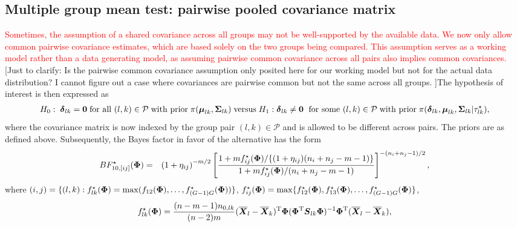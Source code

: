 \documentclass[times,sort&compress,3p]{elsarticle}
\theoremstyle{plain}%
\theoremstyle{definition}
\newcommand{\uzero}            {\mbox{\boldmath$0$}}
\def\be{\begin{eqnarray}}
\def\ee{\end{eqnarray}}
\def\trans{^{\rm T}}
\newcommand{\uS}       {\mbox{\boldmath$S$}}
\newcommand{\uX}       {\mbox{\boldmath$X$}}
\newcommand{\udelta}            {\mbox{\boldmath$\delta$}}
\newcommand{\umu}               {\mbox{\boldmath$\mu$}}
\newcommand{\uSigma}            {\mbox{\boldmath$\Sigma$}}
\newcommand{\uPhi}              {\mbox{\boldmath$\Phi$}}
\begin{document}
\subsection{Multiple group mean test: pairwise pooled covariance matrix} \label{sec:testid}
\textcolor{red}{Sometimes, the assumption of a shared covariance across all groups may not be well-supported by the available data. We now only allow common pairwise covariance estimates, which are based solely on the two groups being compared. This assumption serves as a working model rather than a data generating model, as assuming pairwise common covariance across all pairs also implies common covariances.} {\color{blue}[Just to clarify: Is the pairwise common covariance assumption only posited here for our working model but not for the actual data distribution? I cannot figure out a case where covariances are pairwise common but not the same across all groups. ]}The hypothesis of interest is then expressed as
\be
H_{0}:\;\udelta_{lk} = \uzero \; \mbox{for all }(l, k)\in\mathcal{P}
\;\mbox{with prior}\; \pi(\umu_{lk},\uSigma_{lk})\; \mbox{versus} \; H_{1}:
\udelta_{lk} \neq \uzero \; \mbox{ for some }(l, k)\in\mathcal{P}
\; \mbox{with prior} \; \pi(\udelta_{lk},\umu_{lk},\uSigma_{lk} | \tau_{lk}^\star), 
\label{eq:test2.3}
\ee
where the covariance matrix is now indexed by the group pair $(l, k)\in\mathcal{P}$ and is allowed to be different across pairs. The priors are as defined above. Subsequently, the Bayes factor in favor of the alternative has the form
\be
BF^{\star}_{10,[ij]}(\uPhi) &=& \left(1 + \eta_{ij} \right)^{-m/2} \left[ \frac{1 + {m f^{\star}_{ij}(\uPhi)}/\{(1 + \eta_{ij})(n_{i}+n_{j}-m-1)\}}{ 1 + {m f^{\star}_{ij}(\uPhi)}/{(n_{i}+n_{j}-m-1)}  } \right]^{-(n_{i}+n_{j}-1)/2}, \label{eq:BFmaxija}
\ee
where $(i, j) = \{(l, k) : f_{lk}^\star(\uPhi) = \max(f_{12}(\uPhi), \ldots, f_{(G-1)G}^\star(\uPhi) )  \}$, $f^{\star}_{ij}(\uPhi) = \max\{f^{\star}_{12}(\uPhi), f^{\star}_{13}(\uPhi), \ldots, f^{\star}_{(G-1)G}(\uPhi)\}$,  
\[
f^{\star}_{lk}(\uPhi) = \frac{(n-m-1)n_{0,lk}}{(n-2)m}  (\overline{\uX}_l - \overline{\uX}_k)\trans\uPhi(\uPhi\trans\uS_{lk}\uPhi)^{-1}\uPhi\trans(\overline{\uX}_l - \overline{\uX}_k),
\]
\end{document}
